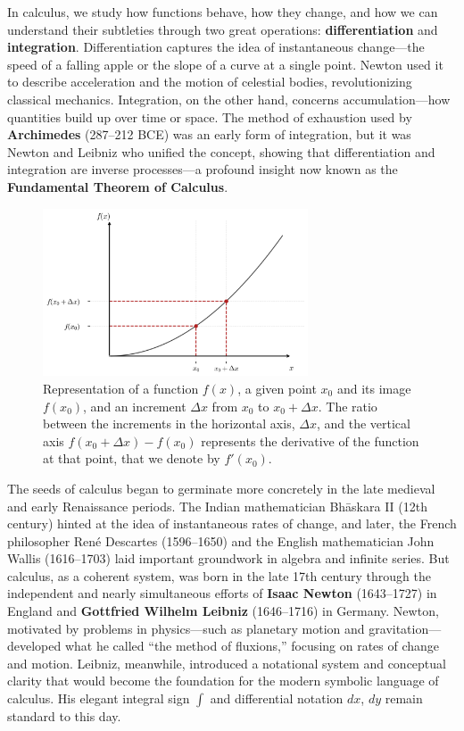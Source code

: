 \documentclass{book}
\begin{document}
In calculus, we study how functions behave, how they change, and how we can understand their subtleties through two great operations: \textbf{differentiation} and \textbf{integration}. Differentiation captures the idea of instantaneous change---the speed of a falling apple or the slope of a curve at a single point. Newton used it to describe acceleration and the motion of celestial bodies, revolutionizing classical mechanics. Integration, on the other hand, concerns accumulation---how quantities build up over time or space. The method of exhaustion used by \textbf{Archimedes} (287--212 BCE) was an early form of integration, but it was Newton and Leibniz who unified the concept, showing that differentiation and integration are inverse processes---a profound insight now known as the \textbf{Fundamental Theorem of Calculus}.\\

\begin{figure}[ht]
    \centering
    \includegraphics[width=0.7\textwidth]{figures/appendix/functions_point_2.png}
    \caption{Representation of a function $f(x)$, a given point $x_0$ and its image $f(x_0)$, and an increment $\Delta x$ from $x_0$ to $x_0 + \Delta x$. The ratio between the increments in the horizontal axis, $\Delta x$, and the vertical axis $f(x_0 + \Delta x) - f(x_0)$ represents the derivative of the function at that point, that we denote by $f'(x_0)$.}
    \label{fig:functions_point_2}
\end{figure}

The seeds of calculus began to germinate more concretely in the late medieval and early Renaissance periods. The Indian mathematician Bhāskara II (12th century) hinted at the idea of instantaneous rates of change, and later, the French philosopher René Descartes (1596--1650) and the English mathematician John Wallis (1616--1703) laid important groundwork in algebra and infinite series. But calculus, as a coherent system, was born in the late 17th century through the independent and nearly simultaneous efforts of \textbf{Isaac Newton} (1643--1727) in England and \textbf{Gottfried Wilhelm Leibniz} (1646--1716) in Germany. Newton, motivated by problems in physics---such as planetary motion and gravitation---developed what he called ``the method of fluxions,'' focusing on rates of change and motion. Leibniz, meanwhile, introduced a notational system and conceptual clarity that would become the foundation for the modern symbolic language of calculus. His elegant integral sign $\int$ and differential notation $dx$, $dy$ remain standard to this day.\\
\end{document}
